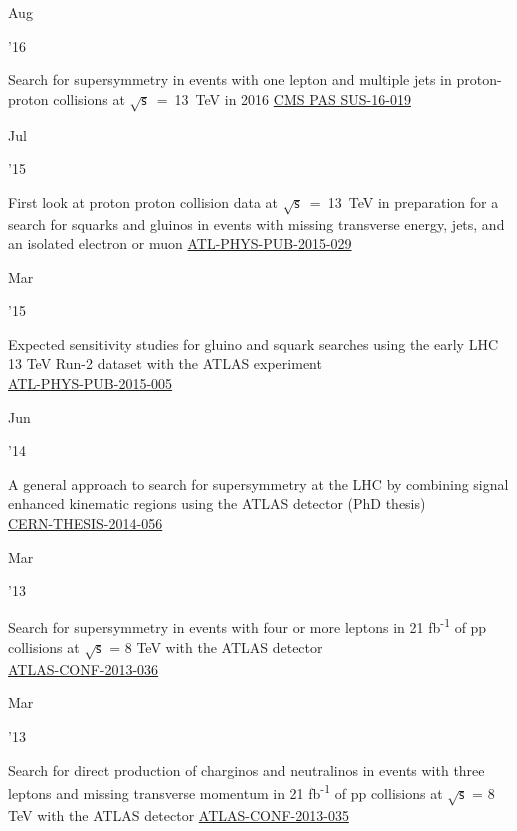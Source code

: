 \documentclass[]{cv} %
\begin{document}
\begin{entrylist}
  \entry
  {\parbox[t]{\parboxWidthOne}{Aug}\parbox[t]{\parboxWidthTwo}{\hfill '16}}
  {Search for supersymmetry in events with one lepton and multiple jets in proton-proton collisions at $\sqrt{\mathsf{s}}$~=~13~TeV in 2016}
  {\href{https://cds.cern.ch/record/2204932}{CMS PAS SUS-16-019}}
  {\vspace*{\spacingPubs}}

  \entry
  {\parbox[t]{\parboxWidthOne}{Jul}\parbox[t]{\parboxWidthTwo}{\hfill '15}}
  {First look at proton proton collision data at $\sqrt{\mathsf{s}}$~=~13~TeV in
  preparation for a search for squarks and gluinos in events with missing
  transverse energy, jets, and an isolated electron or muon}
  {\href{https://cds.cern.ch/record/2037906}{ATL-PHYS-PUB-2015-029}}
  {\vspace*{\spacingPubs}}

  \entry
  {\parbox[t]{\parboxWidthOne}{Mar}\parbox[t]{\parboxWidthTwo}{\hfill '15}}
  {Expected sensitivity studies for gluino and squark searches using the early
  LHC 13 TeV Run-2 dataset with the ATLAS experiment\\}
  {\href{https://cds.cern.ch/record/2002608/}{ATL-PHYS-PUB-2015-005}}
  {\vspace*{\spacingPubs}}

  \entry
  {\parbox[t]{\parboxWidthOne}{Jun}\parbox[t]{\parboxWidthTwo}{\hfill '14}}
  {A general approach to search for supersymmetry at the LHC by combining signal
  enhanced kinematic regions using the ATLAS detector (PhD thesis)\\}
  {\href{https://cds.cern.ch/record/1709233/}{CERN-THESIS-2014-056}}
  {\vspace*{\spacingPubs}}

  \entry
  {\parbox[t]{\parboxWidthOne}{Mar}\parbox[t]{\parboxWidthTwo}{\hfill '13}}
  {Search for supersymmetry in events with four or more leptons in 21 fb\textsuperscript{-1} of pp collisions at
  $\sqrt{\mathsf{s}}$ = 8 TeV with the ATLAS detector\\}
  {\href{https://cds.cern.ch/record/1532429}{ATLAS-CONF-2013-036}}
  {\vspace*{\spacingPubs}}

  \entry
  {\parbox[t]{\parboxWidthOne}{Mar}\parbox[t]{\parboxWidthTwo}{\hfill '13}}
  {Search for direct production of charginos and neutralinos in events with three leptons and missing transverse momentum in 21
    fb\textsuperscript{-1} of pp collisions at $\sqrt{\mathsf{s}}$ = 8 TeV with the ATLAS detector}
    {\href{https://cds.cern.ch/record/1532426}{ATLAS-CONF-2013-035}}
    {\vspace*{\spacingPubs}}


\end{entrylist}
\end{document}
